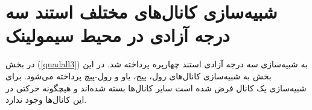 \section{شبیه‌سازی کانال‌های مختلف استند سه درجه آزادی در محیط سیمولینک}
 در بخش
(\ref{quadall3})
 به شبیه‌سازی سه درجه آزادی استند چهارپره پرداخته شد. در این بخش به شبیه‌سازی کانال‌های رول، پیج، یاو و رول-پیچ پرداخته می‌شود. برای شبیه‌سازی یک کانال فرض شده است سایر کانال‌ها بسته شده‌اند و هیچگونه حرکتی در این کانال‌ها وجود ندارد.